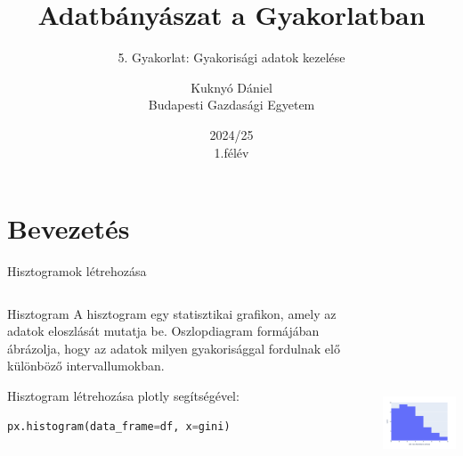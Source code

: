 \documentclass[english, aspectratio=169]{beamer}
\makeatletter
\newcommand\makebeamertitle{\frame{\maketitle}}
\let\origtableofcontents=\tableofcontents
\def\tableofcontents{\@ifnextchar[{\origtableofcontents}{\gobbletableofcontents}}
\def\gobbletableofcontents#1{\origtableofcontents}
\makeatother
\begin{document}
\section{Bevezetés}
\title[]{Adatbányászat a Gyakorlatban}
\subtitle{5. Gyakorlat: Gyakorisági adatok kezelése}
\author[Kuknyó Dániel]{Kuknyó Dániel\\Budapesti Gazdasági Egyetem}
\date{2024/25\\1.félév}
\makebeamertitle

\begin{frame}
\tableofcontents{}
\end{frame}

\begin{frame}
\tableofcontents[currentsection]
\end{frame}

\begin{frame}[fragile]{Hisztogramok létrehozása}
	\begin{columns}
		\begin{column}{.5\textwidth}
			\begin{block}{Hisztogram}
				A hisztogram egy statisztikai grafikon, amely az adatok eloszlását mutatja be. Oszlopdiagram formájában ábrázolja, hogy az adatok milyen gyakorisággal fordulnak elő különböző intervallumokban.
			\end{block}
			\medskip
			Hisztogram létrehozása plotly segítségével:
			\begin{lstlisting}[language=python]
px.histogram(data_frame=df, x=gini)
			\end{lstlisting}
		\end{column}
		\begin{column}{.5\textwidth}
			\begin{center}
				\includegraphics[width=7cm, height=7cm, keepaspectratio]{images/freq_1.png}
			\end{center}
		\end{column}
	\end{columns}
\end{frame}
\end{document}
